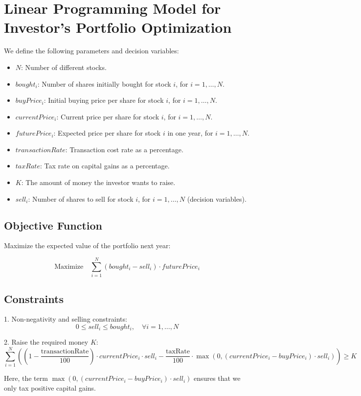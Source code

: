 \documentclass{article}
\begin{document}
\section*{Linear Programming Model for Investor's Portfolio Optimization}

We define the following parameters and decision variables:

\begin{itemize}
    \item $N$: Number of different stocks.
    \item $bought_i$: Number of shares initially bought for stock $i$, for $i = 1, \ldots, N$.
    \item $buyPrice_i$: Initial buying price per share for stock $i$, for $i = 1, \ldots, N$.
    \item $currentPrice_i$: Current price per share for stock $i$, for $i = 1, \ldots, N$.
    \item $futurePrice_i$: Expected price per share for stock $i$ in one year, for $i = 1, \ldots, N$.
    \item $transactionRate$: Transaction cost rate as a percentage.
    \item $taxRate$: Tax rate on capital gains as a percentage.
    \item $K$: The amount of money the investor wants to raise.
    \item $sell_i$: Number of shares to sell for stock $i$, for $i = 1, \ldots, N$ (decision variables).
\end{itemize}

\subsection*{Objective Function}

Maximize the expected value of the portfolio next year:

\[
\text{Maximize} \quad \sum_{i=1}^{N} (bought_i - sell_i) \cdot futurePrice_i
\]

\subsection*{Constraints}

1. Non-negativity and selling constraints:
   \[
   0 \leq sell_i \leq bought_i, \quad \forall i = 1, \ldots, N
   \]

2. Raise the required money $K$:
   \[
   \sum_{i=1}^{N} \left( (1 - \frac{\text{transactionRate}}{100}) \cdot currentPrice_i \cdot sell_i - \frac{\text{taxRate}}{100} \cdot \max(0, (currentPrice_i - buyPrice_i) \cdot sell_i) \right) \geq K
   \]

Here, the term $\max(0, (currentPrice_i - buyPrice_i) \cdot sell_i)$ ensures that we only tax positive capital gains.
\end{document}

